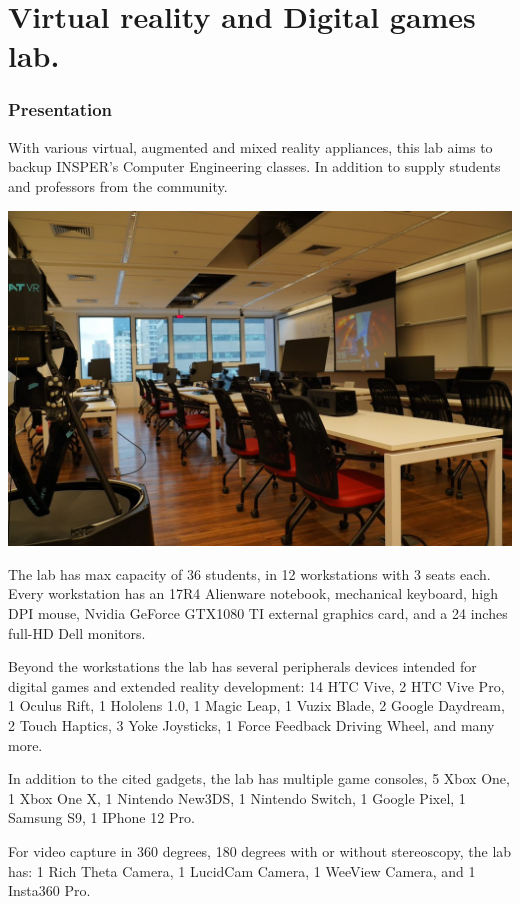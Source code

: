 \section{Virtual reality and Digital games lab.}
\subsubsection{Presentation}

With various virtual, augmented and mixed reality appliances, this lab aims to backup INSPER's Computer Engineering classes. In addition to supply students and professors from the community.

\includegraphics[width=\textwidth]{imgs/labrv.jpg}

The lab has max capacity of 36 students, in 12 workstations with 3 seats each. Every workstation has an 17R4 Alienware notebook, mechanical keyboard, high DPI mouse, Nvidia GeForce GTX1080 TI external graphics card, and a 24 inches full-HD Dell monitors.

Beyond the workstations the lab has several peripherals devices intended for digital games and extended reality development: 14 HTC Vive, 2 HTC Vive Pro, 1 Oculus Rift, 1 Hololens 1.0, 1 Magic Leap, 1 Vuzix Blade, 2 Google Daydream, 2 Touch Haptics, 3 Yoke Joysticks, 1 Force Feedback Driving Wheel, and many more.

In addition to the cited gadgets, the lab has multiple game consoles, 5 Xbox One, 1 Xbox One X, 1 Nintendo New3DS, 1 Nintendo Switch, 1 Google Pixel, 1 Samsung S9, 1 IPhone 12 Pro.

For video capture in 360 degrees, 180 degrees with or without stereoscopy, the lab has: 1 Rich Theta Camera, 1 LucidCam Camera, 1 WeeView Camera, and 1 Insta360 Pro.

